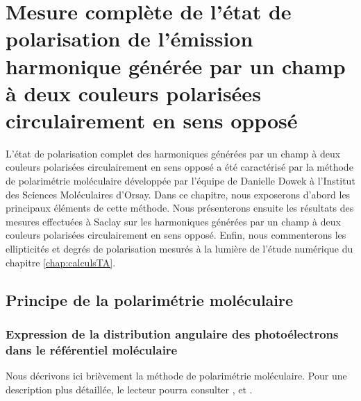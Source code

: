 \chapter{Mesure complète de l'état de polarisation de l'émission harmonique générée par un champ à deux couleurs polarisées circulairement en sens opposé} 
\label{chap:MesurePolar}
L'état de polarisation complet des harmoniques générées par un champ à deux couleurs polarisées circulairement en sens opposé a été caractérisé par la méthode de polarimétrie moléculaire développée par l'équipe de Danielle Dowek à l'Institut des Sciences Moléculaires d'Orsay. Dans ce chapitre, nous exposerons d'abord les principaux éléments de cette méthode. Nous présenterons ensuite les résultats des mesures effectuées à Saclay sur les harmoniques générées par un champ à deux couleurs polarisées circulairement en sens opposé. Enfin, nous commenterons les ellipticités et degrés de polarisation mesurés à la lumière de l'étude numérique du chapitre \ref{chap:calculsTA}.

\section{Principe de la polarimétrie moléculaire}
\label{sec:PrincipePM}
\subsection{Expression de la distribution angulaire des photoélectrons dans le référentiel moléculaire}
Nous décrivons ici brièvement la méthode de polarimétrie moléculaire. Pour une description plus détaillée, le lecteur pourra consulter ,  et .

